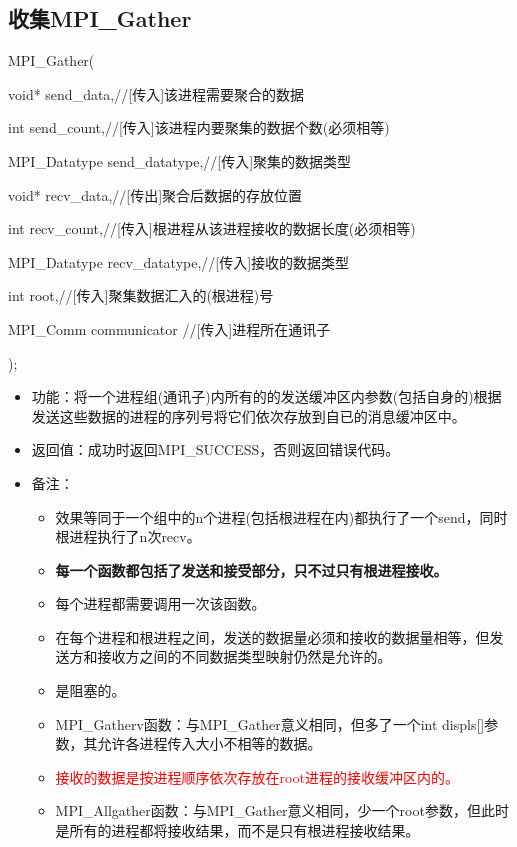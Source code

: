 \documentclass[UTF8]{article}%
\begin{document}
\subsection{收集MPI\_Gather}

MPI\_Gather(

    \qquad void* send\_data,//[传入]该进程需要聚合的数据

    \qquad int send\_count,//[传入]该进程内要聚集的数据个数(必须相等)

    \qquad MPI\_Datatype send\_datatype,//[传入]聚集的数据类型

    \qquad void* recv\_data,//[传出]聚合后数据的存放位置

    \qquad int recv\_count,//[传入]根进程从该进程接收的数据长度(必须相等)

    \qquad MPI\_Datatype recv\_datatype,//[传入]接收的数据类型

    \qquad int root,//[传入]聚集数据汇入的(根进程)号

    \qquad MPI\_Comm communicator //[传入]进程所在通讯子
    
);

\begin{itemize}
    \item 功能：将一个进程组(通讯子)内所有的的发送缓冲区内参数(包括自身的)根据发送这些数据的进程的序列号将它们依次存放到自已的消息缓冲区中。
    \item 返回值：成功时返回MPI\_SUCCESS，否则返回错误代码。
    \item 备注：
    
    {
        \begin{itemize}
            \item 效果等同于一个组中的n个进程(包括根进程在内)都执行了一个send，同时根进程执行了n次recv。
            \item \textbf{每一个函数都包括了发送和接受部分，只不过只有根进程接收。}
            \item 每个进程都需要调用一次该函数。
            \item 在每个进程和根进程之间，发送的数据量必须和接收的数据量相等，但发送方和接收方之间的不同数据类型映射仍然是允许的。
            \item 是阻塞的。
            \item MPI\_Gatherv函数：与MPI\_Gather意义相同，但多了一个int \quad *displs[]参数，其允许各进程传入大小不相等的数据。
            \item \textcolor{red}{接收的数据是按进程顺序依次存放在root进程的接收缓冲区内的。}
            \item MPI\_Allgather函数：与MPI\_Gather意义相同，少一个root参数，但此时是所有的进程都将接收结果，而不是只有根进程接收结果。
        \end{itemize}
    }
\end{itemize}
\end{document}
